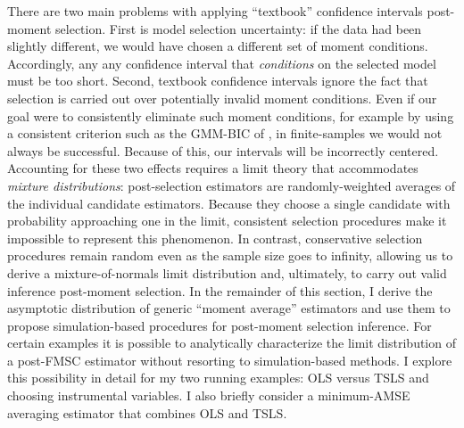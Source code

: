 There are two main problems with applying ``textbook'' confidence intervals post-moment selection.
First is model selection uncertainty: if the data had been slightly different, we would have chosen a different set of moment conditions.
Accordingly, any any confidence interval that \emph{conditions} on the selected model must be too short.
Second, textbook confidence intervals ignore the fact that selection is carried out over potentially invalid moment conditions.
Even if our goal were to consistently eliminate such moment conditions, for example by using a consistent criterion such as the GMM-BIC of \cite{Andrews1999}, in finite-samples we would not always be successful.
Because of this, our intervals will be incorrectly centered.
Accounting for these two effects requires a limit theory that accommodates \emph{mixture distributions}: post-selection estimators are randomly-weighted averages of the individual candidate estimators.
Because they choose a single candidate with probability approaching one in the limit, consistent selection procedures make it impossible to represent this phenomenon.
In contrast, conservative selection procedures remain random even as the sample size goes to infinity, allowing us to derive a mixture-of-normals limit distribution and, ultimately, to carry out valid inference post-moment selection.
In the remainder of this section, I derive the asymptotic distribution of generic ``moment average'' estimators and use them to propose simulation-based procedures for post-moment selection inference. 
For certain examples it is possible to analytically characterize the limit distribution of a post-FMSC estimator without resorting to simulation-based methods.
I explore this possibility in detail for my two running examples: OLS versus TSLS and choosing instrumental variables.
I also briefly consider a minimum-AMSE averaging estimator that combines OLS and TSLS. 

